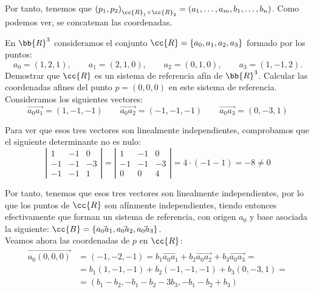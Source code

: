 \begin{ejercicio}
\begin{enumerate}
    Por tanto, tenemos que ${(p_1,p_2)}_{\cc{R}_1\times \cc{R}_2}=(a_1,\dots, a_m,b_1,\dots,b_n)$. Como podemos ver, se concatenan las coordenadas.
\end{enumerate}
\end{ejercicio}



\begin{ejercicio}
    En $\bb{R}^3$ consideramos el conjunto $\cc{R} = \{a_0, a_1, a_2, a_3\}$ formado por los puntos:
    \begin{equation*}
        a_0 = (1, 2, 1),\qquad  a_1 = (2, 1, 0),\qquad a_2 = (0, 1, 0),\qquad a_3 = (1,-1, 2).
    \end{equation*}
    Demostrar que $\cc{R}$ es un sistema de referencia afín de $\bb{R}^3$. Calcular las coordenadas afines del punto $p = (0, 0, 0)$ en este sistema de referencia.\\

    Consideramos los siguientes vectores:
    \begin{equation*}
        \vec{a_0a_1} = (1,-1,-1) \qquad \vec{a_0a_2} = (-1,-1,-1) \qquad \vec{a_0a_3} = (0,-3,1)
    \end{equation*}

    Para ver que esos tres vectores son linealmente independientes, comprobamos que el siguiente determinante no es nulo:
    \begin{equation*}
        \left|\begin{array}{ccc}
            1 & -1 & 0 \\
            -1 & -1 & -3 \\
            -1& -1 & 1
        \end{array}\right| = \left|\begin{array}{ccc}
            1 & -1 & 0 \\
            -1 & -1 & -3 \\
            0& 0 & 4
        \end{array}\right| = 4\cdot (-1 -1)=-8\neq 0
    \end{equation*}

    Por tanto, tenemos que esos tres vectores son linealmente independientes, por lo que los puntos de $\cc{R}$ son afínmente independientes, tiendo entonces efectivamente que forman un sistema de referencia, con origen $a_0$ y base asociada la siguiente: $\cc{B}=\{\vec{a_0a_1},\vec{a_0a_2},\vec{a_0a_3}\}$.\\

    Veamos ahora las coordenadas de $p$ en $\cc{R}$:
    \begin{equation*}\begin{split}
        \vec{a_0(0,0,0)} &= (-1,-2,-1) = b_1\vec{a_0a_1} + b_2\vec{a_0a_2} + b_3\vec{a_0a_3}= \\
        & = b_1(1,-1,-1) +b_2(-1,-1,-1) + b_3(0,-3,1) =\\
        &= (b_1-b_2, -b_1-b_2-3b_3, -b_1-b_2+b_3)
    \end{split}\end{equation*}


\end{ejercicio}
